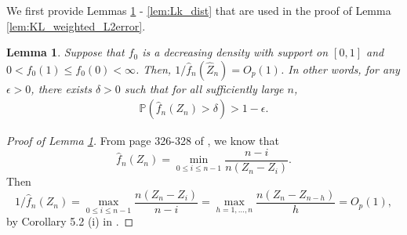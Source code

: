 \documentclass[12pt,letterpaper, twoside, openany]{article}
\theoremstyle{plain}
\newtheorem{theorem}{Theorem}[section]
\newtheorem{lemma}[theorem]{Lemma}
\begin{document}


We first provide Lemmas \ref{lem:inverse_fhat_n_Op1} - \ref{lem:Lk_dist} that are used in the proof of Lemma \ref{lem:KL_weighted_L2error}.
\begin{lemma}\label{lem:inverse_fhat_n_Op1}
Suppose that $f_0$ is a decreasing density with support on $[0, 1]$ and $0 < f_0(1) \leq f_0(0) < \infty$. Then, $1/\hat{f}_n(\hat{Z}_n) = O_p(1)$. In other words, for any $\epsilon>0$, there exists $\delta >0$ such that for all sufficiently large $n$,
\begin{align*}
	\mathbb{P}( \hat{f}_n(Z_n)> \delta ) > 1-\epsilon. 
\end{align*}
\end{lemma}
\begin{proof}[Proof of Lemma \ref{lem:inverse_fhat_n_Op1}]
From page 326-328 of \cite{robertson1988order}, we know that
\begin{equation*}
	\hat{f}_n(Z_n) =  \min_{0 \leq i \leq n-1} \frac{n-i}{n(Z_n - Z_i)}.
\end{equation*}
Then
\begin{equation*}
	1/\hat{f}_n(Z_n) = \max_{0 \leq i \leq n-1} \frac{n(Z_n - Z_i)}{n-i} = \max_{h=1,\ldots,n} \frac{n(Z_n - Z_{n-h})}{h} = O_p(1),
\end{equation*}
by Corollary 5.2 (i) in \cite{chan2018estimation}.
\end{proof}
\end{document}
